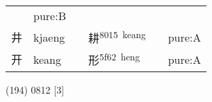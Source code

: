 \documentclass[14pt,a4paper]{scrartcl}
\begin{document}
\begin{longtable}[c]{@{}llllll@{}}
\begin{minipage}[t]{0.14\columnwidth}
\strut\end{minipage} &
\begin{minipage}[t]{0.14\columnwidth}\raggedright\strut
pure:B
\strut\end{minipage}\tabularnewline
\begin{minipage}[t]{0.14\columnwidth}\raggedright\strut
井
\strut\end{minipage} &
\begin{minipage}[t]{0.14\columnwidth}\raggedright\strut
kjaeng
\strut\end{minipage} &
\begin{minipage}[t]{0.14\columnwidth}\raggedright\strut
\strut\end{minipage} &
\begin{minipage}[t]{0.14\columnwidth}\raggedright\strut
耕\textsuperscript{8015~keang}
\strut\end{minipage} &
\begin{minipage}[t]{0.14\columnwidth}\raggedright\strut
\strut\end{minipage} &
\begin{minipage}[t]{0.14\columnwidth}\raggedright\strut
pure:A
\strut\end{minipage}\tabularnewline
\begin{minipage}[t]{0.14\columnwidth}\raggedright\strut
开
\strut\end{minipage} &
\begin{minipage}[t]{0.14\columnwidth}\raggedright\strut
keang
\strut\end{minipage} &
\begin{minipage}[t]{0.14\columnwidth}\raggedright\strut
\strut\end{minipage} &
\begin{minipage}[t]{0.14\columnwidth}\raggedright\strut
形\textsuperscript{5f62~heng}
\strut\end{minipage} &
\begin{minipage}[t]{0.14\columnwidth}\raggedright\strut
\strut\end{minipage} &
\begin{minipage}[t]{0.14\columnwidth}\raggedright\strut
pure:A
\strut\end{minipage}\tabularnewline
\bottomrule
\end{longtable}

(194) 0812 {[}3{]}
\end{document}

